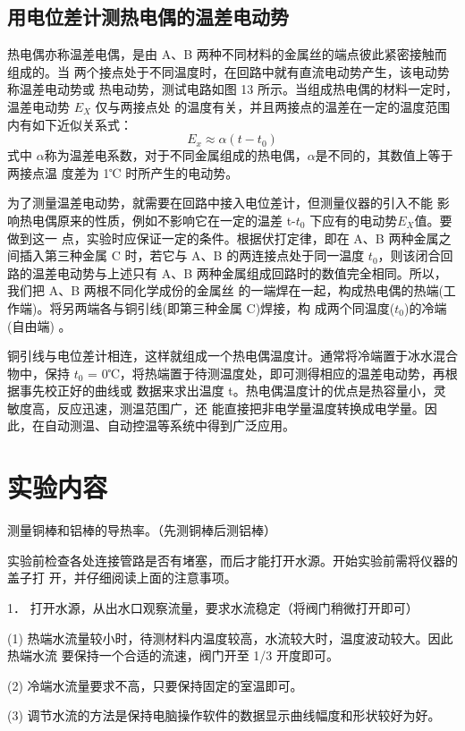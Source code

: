 \documentclass[11pt,a4paper]{article}
\begin{document}
\subsection{用电位差计测热电偶的温差电动势}
热电偶亦称温差电偶，是由 A、B 两种不同材料的金属丝的端点彼此紧密接触而组成的。当
两个接点处于不同温度时，在回路中就有直流电动势产生，该电动势称温差电动势或
热电动势，测试电路如图 13 所示。当组成热电偶的材料一定时，温差电动势 $E_X$ 仅与两接点处
的温度有关，并且两接点的温差在一定的温度范围内有如下近似关系式：
 \begin{equation}
    E_x\approx \alpha (t-t_0)
 \end{equation}
式中 $\alpha $称为温差电系数，对于不同金属组成的热电偶，$\alpha $是不同的，其数值上等于两接点温
度差为 1℃ 时所产生的电动势。

为了测量温差电动势，就需要在回路中接入电位差计，但测量仪器的引入不能
影响热电偶原来的性质，例如不影响它在一定的温差 t-$t_0$ 下应有的电动势$E_X$值。要做到这一
点，实验时应保证一定的条件。根据伏打定律，即在 A、B 两种金属之间插入第三种金属 C
时，若它与 A、B 的两连接点处于同一温度 $t_0$，则该闭合回路的温差电动势与上述只有
A、B 两种金属组成回路时的数值完全相同。所以，我们把 A、B 两根不同化学成份的金属丝
的一端焊在一起，构成热电偶的热端(工作端)。将另两端各与铜引线(即第三种金属 C)焊接，构
成两个同温度($t_0$)的冷端(自由端) 。

铜引线与电位差计相连，这样就组成一个热电偶温度计。通常将冷端置于冰水混合物中，保持
$t_0$ = 0℃，将热端置于待测温度处，即可测得相应的温差电动势，再根据事先校正好的曲线或
数据来求出温度 t。热电偶温度计的优点是热容量小，灵敏度高，反应迅速，测温范围广，还
能直接把非电学量温度转换成电学量。因此，在自动测温、自动控温等系统中得到广泛应用。
\subsw
\section{实验内容}
测量铜棒和铝棒的导热率。（先测铜棒后测铝棒）

实验前检查各处连接管路是否有堵塞，而后才能打开水源。开始实验前需将仪器的盖子打
开，并仔细阅读上面的注意事项。

1． 打开水源，从出水口观察流量，要求水流稳定（将阀门稍微打开即可）

(1) 热端水流量较小时，待测材料内温度较高，水流较大时，温度波动较大。因此热端水流
要保持一个合适的流速，阀门开至 1/3 开度即可。

(2) 冷端水流量要求不高，只要保持固定的室温即可。

(3) 调节水流的方法是保持电脑操作软件的数据显示曲线幅度和形状较好为好。
\end{document}

